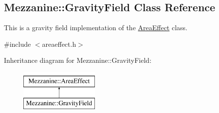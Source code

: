\hypertarget{classMezzanine_1_1GravityField}{
\subsection{Mezzanine::GravityField Class Reference}
\label{classMezzanine_1_1GravityField}
}


This is a gravity field implementation of the \hyperlink{classMezzanine_1_1AreaEffect}{AreaEffect} class.  




{\ttfamily \#include $<$areaeffect.h$>$}

Inheritance diagram for Mezzanine::GravityField:\begin{figure}[H]
\begin{center}
\leavevmode
\includegraphics[height=2.000000cm]{classMezzanine_1_1GravityField}
\end{center}
\end{figure}
